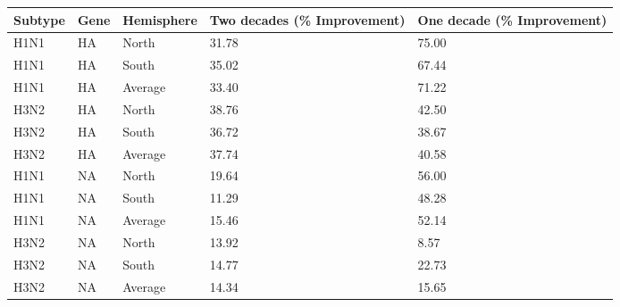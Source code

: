 \begin{tabular}{C{.5in}|C{.5in}|C{.75in}|C{1.75in}|C{1.75in}}\hline
Subtype & Gene & Hemisphere & Two  decades  (\%  Improvement) & One  decade  (\%  Improvement) \\\hline
H1N1&HA& North &31.78&75.00\\\hline
H1N1&HA& South &35.02&67.44\\\hline
{}H1N1&HA&Average&33.40&71.22\\\hline
H3N2&HA& North &38.76&42.50\\\hline
H3N2&HA& South &36.72&38.67\\\hline
{}H3N2&HA&Average&37.74&40.58\\\hline
H1N1&NA& North &19.64&56.00\\\hline
H1N1&NA& South &11.29&48.28\\\hline
{}H1N1&NA&Average&15.46&52.14\\\hline
H3N2&NA& North &13.92&8.57\\\hline
H3N2&NA& South &14.77&22.73\\\hline
{}H3N2&NA&Average&14.34&15.65\\\hline
\end{tabular}
